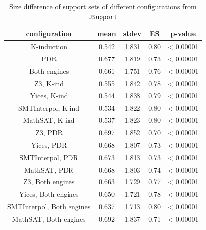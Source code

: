 \begin{table}
  \centering
  \begin{tabular}{|c|c|c|c|c|}
     \hline
     configuration & mean & stdev & ES & p-value \\[0.5ex]
     \hline\hline
     K-induction  & 0.542 & 1.831 & 0.80 & < 0.00001\\[0.5ex] %
     PDR & 0.677 & 1.819 & 0.73 & < 0.00001\\[0.5ex] %
     Both engines & 0.661 & 1.751 & 0.76 & < 0.00001\\[0.5ex]
     \hline
     Z3, K-ind & 0.555 & 1.842 & 0.78 & < 0.00001\\[0.5ex]%
     Yices, K-ind  & 0.544 & 1.838 & 0.79 & < 0.00001\\[0.5ex]
     SMTInterpol, K-ind & 0.534 & 1.822 & 0.80 & < 0.00001\\[0.5ex]
     MathSAT, K-ind  & 0.537 & 1.823 & 0.80 & < 0.00001\\[0.5ex]
     \hline
     Z3, PDR & 0.697 & 1.852 & 0.70 & < 0.00001\\[0.5ex]%
     Yices, PDR  & 0.668 & 1.807 & 0.73 & < 0.00001\\[0.5ex]
     SMTInterpol, PDR  & 0.673 & 1.813 & 0.73 & < 0.00001\\[0.5ex]
     MathSAT, PDR  & 0.668 & 1.803 & 0.74 & < 0.00001\\[0.5ex]
     \hline
     Z3, Both engines & 0.663 & 1.729 & 0.77 & < 0.00001\\[0.5ex]
     Yices, Both engines  & 0.650 & 1.721 & 0.78 & < 0.00001\\[0.5ex]
     SMTInterpol, Both engines  & 0.637 & 1.713 & 0.80 & < 0.00001\\[0.5ex]
     MathSAT, Both engines & 0.692 & 1.837 & 0.71 & < 0.00001\\[0.5ex]
     \hline
   \end{tabular}
     \caption{Size difference of support sets of different configurations from \texttt{JSupport}}\label{tab:minimality}
\end{table}


%
%
\vspace{6pt}
\noindent{}
 \vspace{6pt}

